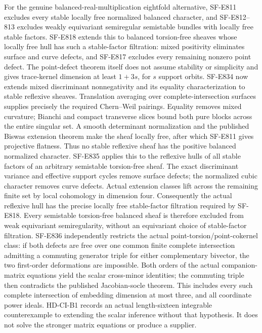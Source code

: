\documentclass[11pt]{article}
\theoremstyle{remark}\newtheorem{remark}[theorem]{Remark}
\begin{document}
For the genuine balanced-real-multiplication eightfold alternative,
SF-E811 excludes every stable locally free normalized balanced character,
and SF-E812--813 excludes weakly equivariant semiregular semistable
bundles with locally free stable factors. SF-E818 extends this to
balanced torsion-free sheaves whose locally free hull has such a
stable-factor filtration: mixed positivity eliminates surface and curve
defects, and SF-E817 excludes every remaining nonzero point defect.
The point-defect theorem itself does not assume stability or simplicity
and gives trace-kernel dimension at least $1+3s$, for $s$ support orbits.
SF-E834 now extends mixed discriminant nonnegativity and its equality
characterization to stable reflexive sheaves. Translation averaging
over complete-intersection surfaces supplies precisely the required
Chern--Weil pairings. Equality removes mixed curvature; Bianchi and
compact transverse slices bound both pure blocks across the entire
singular set. A smooth determinant normalization and the published
Biswas extension theorem make the sheaf locally free, after which
SF-E811 gives projective flatness. Thus no stable reflexive sheaf has
the positive balanced normalized character.
SF-E835 applies this to the reflexive hulls of all stable factors of
an arbitrary semistable torsion-free sheaf. The exact discriminant
variance and effective support cycles remove surface defects; the
normalized cubic character removes curve defects. Actual extension
classes lift across the remaining finite set by local cohomology in
dimension four. Consequently the actual reflexive hull has the precise
locally free stable-factor filtration required by SF-E818.
Every semistable torsion-free balanced sheaf is therefore excluded
from weak equivariant semiregularity, without an equivariant choice
of stable-factor filtration.
SF-E836 independently restricts the actual point-torsion/point-cokernel
class: if both defects are free over one common finite complete
intersection admitting a commuting generator triple for either
complementary bivector, the two first-order deformations are impossible.
Both orders of the actual companion-matrix equations yield the scalar
cross-minor identities; the commuting triple then contradicts the
published Jacobian-socle theorem. This includes every such complete
intersection of embedding dimension at most three, and all coordinate
power ideals. HD-CI-B1 records an actual length-sixteen integrable
counterexample to extending the scalar inference without that hypothesis.
It does not solve the stronger matrix equations or produce a supplier.
\end{document}
